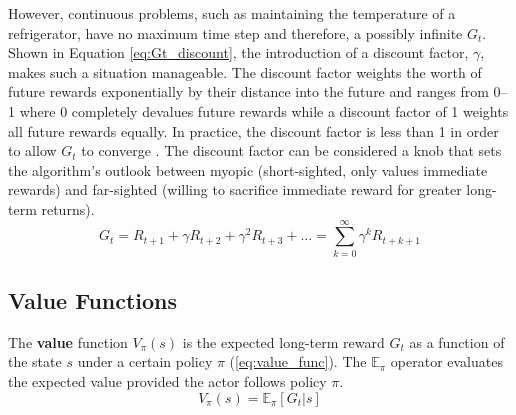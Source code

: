 However, continuous problems, such as maintaining the temperature of a refrigerator, have no maximum time step and therefore, a possibly infinite $G_t$. Shown in Equation \ref{eq:Gt_discount}, the introduction of a discount factor, $\gamma$, makes such a situation manageable. The discount factor weights the worth of future rewards exponentially by their distance into the future and ranges from 0--1 where 0 completely devalues future rewards while a discount factor of 1 weights all future rewards equally. In practice, the discount factor is less than 1 in order to allow $G_t$ to converge \cite{sutton_2017}. The discount factor can be considered a knob that sets the algorithm's outlook between myopic (short-sighted, only values immediate rewards) and far-sighted (willing to sacrifice immediate reward for greater long-term returns).
\begin{equation}
\label{eq:Gt_discount}
	G_t=R_{t+1}+\gamma R_{t+2}+\gamma^2 R_{t+3} + \dots = \sum_{k=0}^{\infty} \gamma^k R_{t+k+1}
\end{equation}

\subsection{Value Functions}
The \textbf{value} function $V_\pi(s)$ is the expected long-term reward $G_t$ as a function of the state $s$ under a certain policy $\pi$ (\ref{eq:value_func}). The $\mathbb{E}_\pi$ operator evaluates the expected value provided the actor follows policy $\pi$.
\begin{equation}
	\label{eq:value_func}
	V_\pi(s)=\mathbb{E}_\pi [G_t | s]
\end{equation}

